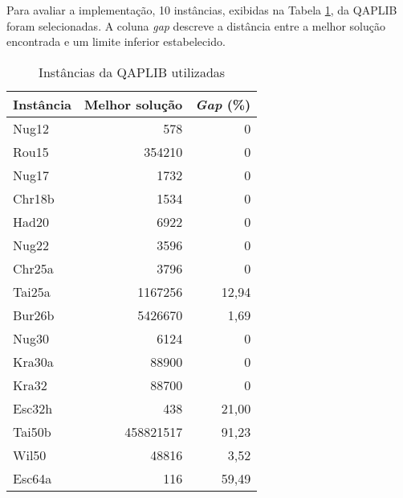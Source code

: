 Para avaliar a implementação, 10 instâncias, exibidas na Tabela
\ref{qapinst}, da QAPLIB \cite{qaplib} foram selecionadas. A coluna
\textit{gap} descreve a distância entre a melhor solução encontrada e
um limite inferior estabelecido.

\begin{table}[H]
  \caption{Instâncias da QAPLIB utilizadas\label{qapinst}}
  \centering
  \begin{tabular}{l r r}
    \toprule
    Instância & Melhor solução & \textit{Gap} (\%) \\
    \midrule
    Nug12 & 578 & 0 \\
    Rou15 & 354210 & 0 \\
    Nug17 & 1732 & 0 \\
    Chr18b & 1534 & 0 \\
    Had20 & 6922 & 0 \\
    Nug22 & 3596 & 0 \\
    Chr25a & 3796 & 0 \\
    Tai25a & 1167256 & 12,94 \\
    Bur26b & 5426670 & 1,69 \\
    Nug30 & 6124 & 0 \\
    Kra30a & 88900 & 0 \\
    Kra32  & 88700 & 0 \\
    Esc32h & 438 & 21,00 \\
    Tai50b & 458821517 & 91,23 \\
    Wil50 & 48816 & 3,52 \\
    Esc64a & 116 & 59,49 \\
    \bottomrule
  \end{tabular}
\end{table}
